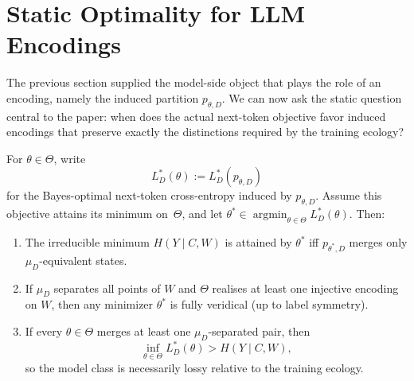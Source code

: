 \documentclass[twoside,11pt]{article}
\newcommand{\argmin}{\operatorname*{argmin}}
\begin{document}
\section{Static Optimality for LLM Encodings}\label{sec:static}

The previous section supplied the model-side object that plays the role of an encoding, namely the induced partition $p_{\theta,D}$. We can now ask the static question central to the paper: when does the actual next-token objective favor induced encodings that preserve exactly the distinctions required by the training ecology?

\begin{theorem}\label{thm:llm-veridicality}
For $\theta \in \Theta$, write
\[
L_D^*(\theta) := L_D^*(p_{\theta,D})
\]
for the Bayes-optimal next-token cross-entropy induced by $p_{\theta,D}$. Assume this objective attains its minimum on~$\Theta$, and let $\theta^* \in \argmin_{\theta \in \Theta} L_D^*(\theta)$. Then:
\begin{enumerate}[label=(\alph*)]
\item The irreducible minimum $H(Y \mid C,W)$ is attained by $\theta^*$ iff $p_{\theta^*,D}$ merges only $\mu_D$-equivalent states.

\item If $\mu_D$ separates all points of $W$ and $\Theta$ realises at least one injective encoding on $W$, then any minimizer $\theta^*$ is fully veridical (up to label symmetry).

\item If every $\theta \in \Theta$ merges at least one $\mu_D$-separated pair, then
\[
\inf_{\theta \in \Theta} L_D^*(\theta) > H(Y \mid C,W),
\]
so the model class is necessarily lossy relative to the training ecology.
\end{enumerate}
\end{theorem}
\end{document}
